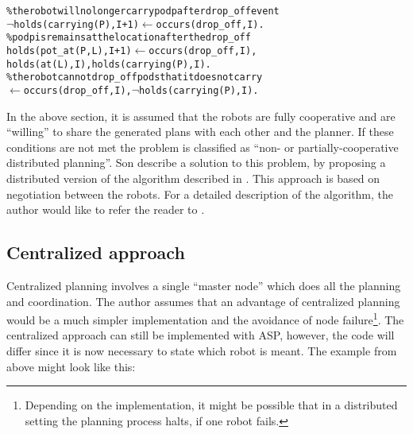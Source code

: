 \documentclass[runningheads]{llncs}
\newcommand{\authorquote}{Son \etal}
\begin{document}
    \vspace{0.6cm}
    
    
    \begin{alltt}
   \% the robot will no longer carry pod p after drop_off event
   \(\neg\)holds(carrying(P), I + 1) \(\leftarrow\) occurs(drop_off, I).
   \% pod p is remains at the location after the drop_off
   holds(pot_at(P, L), I + 1) \(\leftarrow\) occurs(drop_off, I), 
       holds(at(L), I), holds(carrying(P), I). 
   \% the robot cannot drop_off pods that it does not carry
   \(\leftarrow\) occurs(drop_off, I), \(\neg\)holds(carrying(P), I). 
    \end{alltt}
    

    In the above section, it is assumed that the robots are fully cooperative and are ``willing'' to share the generated plans with each other and the planner. If these conditions are not met the problem is classified as ``non- or partially-cooperative distributed planning''. \authorquote{} describe a solution to this problem, by proposing a distributed version of the algorithm described in \cite{son2009logic}. This approach is based on negotiation between the robots. For a detailed description of the algorithm, the author would like to refer the reader to \cite{son2018answer}.
    

    

\subsection{Centralized approach} \label{8:subsec:centralized}

Centralized planning involves a single ``master node'' which does all the planning and coordination. The author assumes that an advantage of centralized planning would be a much simpler implementation and the avoidance of node failure\footnote{Depending on the implementation, it might be possible that in a distributed setting the planning process halts, if one robot fails.}. The centralized approach can still be implemented with ASP, however, the code will differ since it is now necessary to state which robot is meant. The example from above might look like this:  
\end{document}
